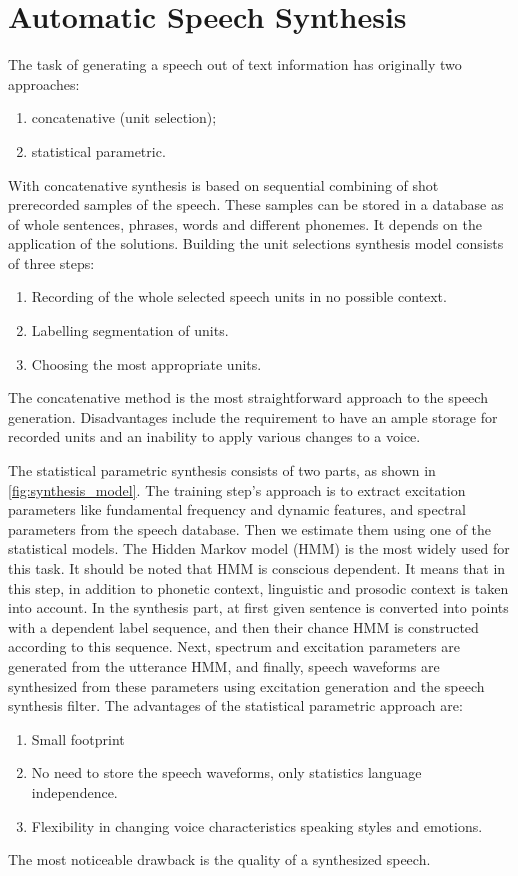 \section{Automatic Speech Synthesis}

The task of generating a speech out of text information has originally two approaches:
\begin{enumerate}
    \item concatenative (unit selection);
    \item statistical parametric.
\end{enumerate}

With concatenative synthesis is based on sequential combining of shot prerecorded samples of the speech. These samples can be stored in a database as of whole sentences, phrases, words and different phonemes. It depends on the application of the solutions. Building the unit selections synthesis model consists of three steps:

\begin{enumerate}
    \item Recording of the whole selected speech units in no possible context.
    \item Labelling segmentation of units.
    \item Choosing the most appropriate units. 
\end{enumerate}

The concatenative method is the most straightforward approach to the speech generation. Disadvantages include the requirement to have an ample storage for recorded units and an inability to apply various changes to a voice.

The statistical parametric synthesis consists of two parts, as shown in \cref{fig:synthesis_model}. The training step's approach is to extract excitation parameters like fundamental frequency and dynamic features, and spectral parameters from the speech database. Then we estimate them using one of the statistical models. The Hidden Markov model (HMM) is the most widely used for this task. It should be noted that HMM is conscious dependent. It means that in this step, in addition to phonetic context, linguistic and prosodic context is taken into account. In the synthesis part, at first given sentence is converted into points with a dependent label sequence, and then their chance HMM is constructed according to this sequence. Next, spectrum and excitation parameters are generated from the utterance HMM, and finally, speech waveforms are synthesized from these parameters using excitation generation and the speech synthesis filter. The advantages of the statistical parametric approach are:
\begin{enumerate}
    \item Small footprint
    \item No need to store the speech waveforms, only statistics language independence.
    \item Flexibility in changing voice characteristics speaking styles and emotions.
\end{enumerate}
The most noticeable drawback is the quality of a synthesized speech.

